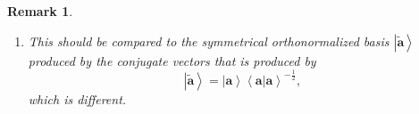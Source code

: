 \documentclass[aps,preprint]{revtex4}%
\newtheorem{remark}[theorem]{Remark}
\begin{document}
\begin{remark}
\begin{enumerate}
\begin{enumerate}
\item
\begin{gather}
\sum_{1\leq j\leq n}\left\vert \alpha_{j}\right\rangle \mathcal{R}_{a}\left(
\Sigma\left(  A^{\dagger}A\right)  \right)  _{jj}\left\langle \alpha
_{j}\right\vert \left(  \left\vert \alpha_{k}\right\rangle \mathcal{R}%
_{a}\left(  \Sigma\left(  A^{\dagger}A\right)  \right)  _{kk}^{-\frac{1}{2}%
}\right)  =\left\vert \alpha_{k}\right\rangle \mathcal{R}_{a}\left(
\Sigma\left(  A^{\dagger}A\right)  \right)  _{kk}^{\frac{1}{2}}\\
\Downarrow\\
\left(  \left\langle \alpha_{l}\right\vert \mathcal{R}_{a}\left(
\Sigma\left(  A^{\dagger}A\right)  \right)  _{ll}^{-\frac{1}{2}}\right)
A^{\dagger}A\left(  \left\vert \alpha_{k}\right\rangle \mathcal{R}_{a}\left(
\Sigma\left(  A^{\dagger}A\right)  \right)  _{kk}^{-\frac{1}{2}}\right)
=\left(  \left\langle \alpha_{l}\right\vert \mathcal{R}_{a}\left(
\Sigma\left(  A^{\dagger}A\right)  \right)  _{kk}^{-\frac{1}{2}}\right)
\left(  \left\vert \alpha_{k}\right\rangle \mathcal{R}_{a}\left(
\Sigma\left(  A^{\dagger}A\right)  \right)  _{kk}^{\frac{1}{2}}\right)
=\delta_{lk}\\
1\leq l,k\leq n
\end{gather}
hence the conjugate vectors in terms of the eigenvectors are
\begin{equation}
\left\vert a_{k}\right\rangle =\left(  \left\vert \alpha_{k}\right\rangle
\mathcal{R}_{a}\left(  \Sigma\left(  A^{\dagger}A\right)  \right)
_{kk}^{-\frac{1}{2}}\right)  ,\,1\leq k\leq r,
\end{equation}
i.e.%
\begin{equation}
\left\vert \mathbf{a}\right\rangle =\left\vert \mathbf{\alpha}\right\rangle
\Sigma\left(  A^{\dagger}A\right)  ^{-\frac{1}{2}}%
\end{equation}
and thus the eigenvectors vectors in terms of the conjugate are
\begin{equation}
\left\vert \mathbf{\alpha}\right\rangle =\left\vert \mathbf{a}\right\rangle
\Sigma\left(  A^{\dagger}A\right)  ^{\frac{1}{2}}.
\end{equation}

\end{enumerate}

\item This should be compared to the \emph{symmetrical orthonormalized} basis
$\left\vert \widetilde{\mathbf{a}}\right\rangle $ produced by the conjugate
vectors that is produced by
\begin{equation}
\left\vert \widetilde{\mathbf{a}}\right\rangle =\left\vert \mathbf{a}%
\right\rangle \left\langle \left.  \mathbf{a}\right\vert \mathbf{a}%
\right\rangle ^{-\frac{1}{2}},
\end{equation}
which is different.


\end{enumerate}
\end{remark}
\end{document}
